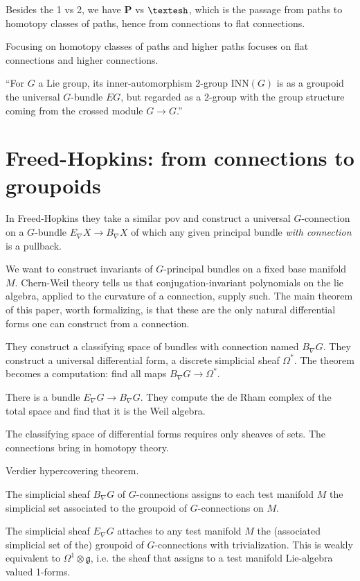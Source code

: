 \documentclass[12pt]{article}
\newcommand{\shape}{\ensuremath{\text{\textesh}}}
\begin{document}
Besides the 1 vs 2, we have $\textbf{P}$ vs $\shape$, which is the passage from paths to homotopy classes of paths, hence from connections to flat connections.

Focusing on homotopy classes of paths and higher paths focuses on flat connections and higher connections.

``For $G$ a Lie group, its inner-automorphism 2-group $\mathrm{INN}(G)$ is as a groupoid the universal $G$-bundle $EG$, but regarded as a 2-group with the group structure coming from the crossed module $G\to G$.''

\section{Freed-Hopkins: from connections to groupoids}
In Freed-Hopkins \cite{freed2013chernweil} they take a similar pov and construct a universal $G$-connection on a $G$-bundle $E_{\nabla}X\to B_{\nabla}X$ of which any given principal bundle \emph{with connection} is a pullback.

We want to construct invariants of $G$-principal bundles on a fixed base manifold $M$. Chern-Weil theory tells us that conjugation-invariant polynomials on the lie algebra, applied to the curvature of a connection, supply such. The main theorem of this paper, worth formalizing, is that these are the only natural differential forms one can construct from a connection.

They construct a classifying space of bundles with connection named $B_{\nabla}G$. They construct a universal differential form, a discrete simplicial sheaf $\Omega^{*}$. The theorem becomes a computation: find all maps $B_{\nabla}G \to \Omega^{*}.$

There is a bundle $E_{\nabla}G \to B_{\nabla}G$. They compute the de Rham complex of the total space and find that it is the Weil algebra.

The classifying space of differential forms requires only sheaves of sets. The connections bring in homotopy theory.

Verdier hypercovering theorem.

The simplicial sheaf $B_{\nabla}G$ of $G$-connections assigns to each test manifold $M$ the simplicial set associated to the groupoid of $G$-connections on $M$.

The simplicial sheaf $E_{\nabla}G$ attaches to any test manifold $M$ the (associated simplicial set of the) groupoid of $G$-connections with trivialization. This is weakly equivalent to $\Omega^1 \otimes\mathfrak{g}$, i.e. the sheaf that assigns to a test manifold Lie-algebra valued 1-forms.
\end{document}
